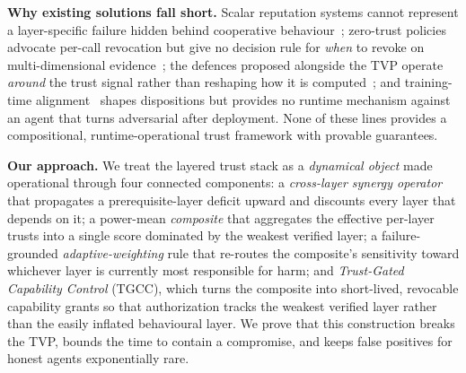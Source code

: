 \documentclass[sigconf,anonymous]{acmart}
\theoremstyle{plain}
\theoremstyle{definition}
\theoremstyle{remark}
\begin{document}
\textbf{Why existing solutions fall short.}
Scalar reputation systems cannot represent a layer-specific failure hidden behind
cooperative behaviour~\cite{ramchurn2004trust,josang2002beta}; zero-trust policies
advocate per-call revocation but give no decision rule for \emph{when} to revoke on
multi-dimensional evidence~\cite{zerotrust2025,nist800207}; the defences proposed
alongside the TVP operate \emph{around} the trust signal rather than reshaping how it is
computed~\cite{qi2025trust}; and training-time alignment~\cite{christiano2017deep,
ouyang2022training,bai2022constitutional} shapes dispositions but provides no runtime
mechanism against an agent that turns adversarial after deployment. None of these lines
provides a compositional, runtime-operational trust framework with provable guarantees.

\textbf{Our approach.}
We treat the layered trust stack as a \emph{dynamical object} made operational through
four connected components: a \emph{cross-layer synergy operator} that propagates a
prerequisite-layer deficit upward and discounts every layer that depends on it; a
power-mean \emph{composite} that aggregates the effective per-layer trusts into a single
score dominated by the weakest verified layer; a failure-grounded
\emph{adaptive-weighting} rule that re-routes the composite's sensitivity toward whichever
layer is currently most responsible for harm; and \emph{Trust-Gated Capability Control}
(TGCC), which turns the composite into short-lived, revocable capability grants so that
authorization tracks the weakest verified layer rather than the easily inflated
behavioural layer. We prove that this construction breaks the TVP, bounds the time to
contain a compromise, and keeps false positives for honest agents exponentially rare.
\end{document}
